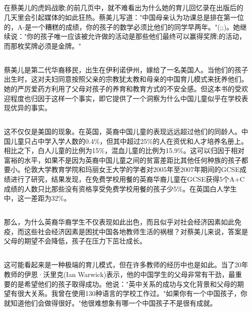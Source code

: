 \documentclass[]{article}
\begin{document}
\begin{spacing}{1.75}
{\Large 
	\subsection{}
	在蔡美儿的虎妈战歌;的前几页中，就不难看出为什么她的育儿回忆录在出版后的几天里会引起媒体的如此狂热。蔡美儿写道："中国母亲认为功课总是排在第一位的，A-是一个糟糕的成绩，你的孩子的数学必须比他们的同学早两年。"(;;)。她继续说："你的孩子唯一应该被允许做的活动是那些他们最终可以赢得奖牌;的活动，而那枚奖牌必须是金牌。"
	\subsection{}
	蔡美儿是第二代华裔移民，出生在伊利诺伊州，嫁给了一名美国人。当他们的孩子出生时，这对夫妇同意按照父亲的宗教犹太教和母亲的中国育儿模式来抚养他们。她的严厉爱药方利用了父母对孩子的养育和教育方式的不安全感。但这本书的受欢迎程度也归因于这样一个事实，即它提供了一个洞察为什么中国儿童似乎在学校表现优异的事实。
	\subsection{}
	这不仅仅是美国的现象。在英国，英裔中国儿童的表现远远超过他们的同龄人。中国儿童只占中学入学人数的0.4\%，但其中超过25\%的人在资优和人才培养名册上。相比之下，白人儿童的比例为15\%，混血儿童的比例为15.9\%。这可以归因于相对富裕的水平，如果不是因为英裔中国儿童之间的贫富差距比其他任何种族的孩子都要小。伦敦大学教育学院和玛丽女王大学的学者对2005年至2007年期间的GCSE成绩进行了研究，结果发现，在免费学校用餐的英裔华裔儿童在GCSE获得5个A+C成绩的人数只比那些没有资格享受免费学校用餐的孩子少5\%。在英国白人学生中，这一差距为32\%。
	\subsection{}
	那么，为什么英裔华裔学生不仅表现如此出色，而且似乎对社会经济因素如此免疫，而这些社会经济因素是困扰中国各地教师生活的祸根？对蔡美儿来说，答案是父母的期望不会降低，孩子在压力下茁壮成长。
	\subsection{}
	这可能看起来是一种极端的育儿模式，但在许多教师的经历中也是如此。当了20年教师的伊恩·沃里克(Ian Warwick)表示，他的中国学生的父母非常有干劲，最重要的是希望他们的孩子取得成功。他说："英中关系的成功与文化背景和父母的期望有很大关系。我曾在使用130种语言的学校工作过。"如果你有一个中国孩子，你就知道他们会做得很好。"他很难想象有哪一个中国孩子不是很有成就。
}
\end{spacing}
\end{document}
